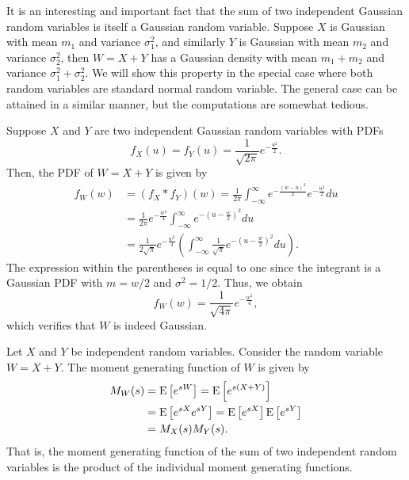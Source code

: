 \begin{example}
It is an interesting and important fact that the sum of two independent Gaussian random variables is itself a Gaussian random variable.
Suppose $X$ is Gaussian with mean $m_1$ and variance $\sigma_1^2$, and similarly $Y$ is Gaussian with mean $m_2$ and variance $\sigma_2^2$, then $W = X + Y$ has a Gaussian density with mean $m_1 + m_2$ and variance $\sigma_1^2 + \sigma_2^2$.
We will show this property in the special case where both random variables are standard normal random variable.
The general case can be attained in a similar manner, but the computations are somewhat tedious.

Suppose $X$ and $Y$ are two independent Gaussian random variables with PDFs
\begin{equation*}
f_X(u) = f_Y(u) = \frac 1{\sqrt{2\pi}} e^{-\frac{u^2}{2}} .
\end{equation*}
Then, the PDF of $W = X + Y$ is given by
\begin{equation*}
\begin{split}
f_W (w) &= (f_X \ast f_Y) (w)
= \frac{1}{2\pi}
\int_{-\infty}^{\infty} e^{-\frac{(w - u)^2}{2}} e^{-\frac{u^2}{2}} du \\
&= \frac{1}{2\pi} e^{- \frac{w^2}{4}}
\int_{-\infty}^{\infty} e^{- \left( u - \frac{w}{2} \right)^2} du \\
&= \frac{1}{2 \sqrt{\pi}} e^{- \frac{w^2}{4}}
\left( \int_{-\infty}^{\infty} \frac{1}{\sqrt{\pi}}
e^{-\left( u - \frac{w}{2} \right)^2} du \right) .
\end{split}
\end{equation*}
The expression within the parentheses is equal to one since the integrant is a Gaussian PDF with $m = w/2$ and $\sigma^2 = 1/2$.
Thus, we obtain
\begin{equation*}
f_W(w) = \frac{1}{\sqrt{4\pi}} e^{-\frac{w^2}{4}} ,
\end{equation*}
which verifies that $W$ is indeed Gaussian.
\end{example}

Let $X$ and $Y$ be independent random variables.
Consider the random variable $W = X + Y$.
The moment generating function of $W$ is given by
\begin{equation*}
\begin{split}
M_W (s) &= \mathrm{E} \left[ e^{sW} \right]
= \mathrm{E} \left[ e^{s(X + Y)} \right] \\
&= \mathrm{E} \left[ e^{sX} e^{sY} \right]
= \mathrm{E} \left[ e^{sX} \right] \mathrm{E} \left[ e^{sY} \right] \\
&= M_X(s) M_Y(s) .
\end{split}
\end{equation*}
That is, the moment generating function of the sum of two independent random variables is the product of the individual moment generating functions.

